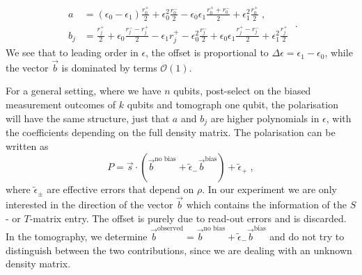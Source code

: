 \documentclass[a4paper,twocolumn,11pt, accepted=2024-06-14]{quantumarticle}
\begin{document}
\begin{equation}
\begin{aligned}
	a&=(\epsilon_0-\epsilon_1) \frac{r^+_0}{2} +\epsilon_0^2 \frac{r^-_0}{2} -\epsilon_0 \epsilon_1 \frac{r^+_0+r^-_0}{2} +\epsilon_1^2 \frac{r_0^+}{2}\;,\\
	b_j&=\frac{r^+_j}{2}+ \epsilon_0 \frac{r^-_j-r^+_j}{2} -\epsilon_1 r^+_j -\epsilon_0^2 \frac{r^-_j}{2} +\epsilon_0 \epsilon_1 \frac{r^+_j-r^-_j}{2} + \epsilon_1^2 \frac{r_j^+}{2}
	\end{aligned}\;.
\end{equation}
We see that to leading order in $\epsilon$, the offset is proportional to $\Delta \epsilon=\epsilon_1-\epsilon_0$, while the vector $\vec b$ is dominated by terms $\mathcal O(1)$.

For a general setting, where we have $n$ qubits, post-select on the biased measurement outcomes of $k$ qubits and tomograph one qubit, the polarisation will have the same structure, just that $a$ and $b_j$ are higher polynomials in $\epsilon$, with the coefficients depending on the full density matrix. The polarisation can be written as 
\begin{equation}
	P=\vec s \cdot (\vec b^\text{no bias} + \tilde{\epsilon}_- \vec b^\text{bias}) + \tilde \epsilon_+ \;,
\end{equation}
where $\tilde \epsilon_\pm$ are effective errors that depend on $\rho$. In our experiment we are only interested in the direction of the vector $\vec b$ which contains the information of the $S$- or $T$-matrix entry. The offset is purely due to read-out errors and is discarded. In the tomography, we determine $\vec b^\text{observed}=\vec b^\text{no bias} + \tilde{\epsilon}_- \vec b^\text{bias}$ and do not try to distinguish between the two contributions, since we are dealing with an unknown density matrix. 




\end{document}
